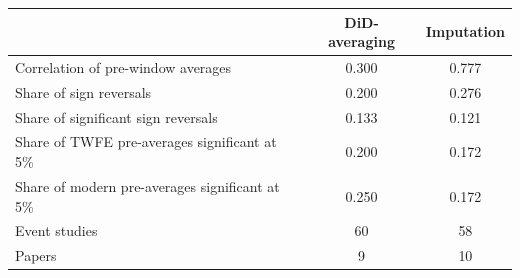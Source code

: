 \begin{tabular}{lcc}
\toprule
 & DiD-averaging & Imputation \\
\midrule
Correlation of pre-window averages & 0.300 & 0.777 \\
Share of sign reversals & 0.200 & 0.276 \\
Share of significant sign reversals & 0.133 & 0.121 \\
Share of TWFE pre-averages significant at 5\% & 0.200 & 0.172 \\
Share of modern pre-averages significant at 5\% & 0.250 & 0.172 \\
\midrule
Event studies & 60 & 58 \\
Papers & 9 & 10 \\
\bottomrule
\end{tabular}
